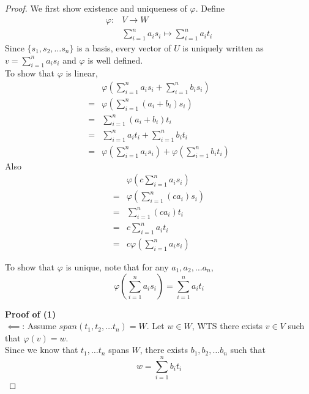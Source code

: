 \begin{proof}


We first show existence and uniqueness of $\varphi$. Define 
\begin{align*}
    \varphi: &V \to W \\
    & \sum\limits_{i = 1}^{n} a_i s_i \mapsto \sum\limits_{i = 1}^{n} a_i t_i
\end{align*}
Since $\{ s_1, s_2, \hdots s_n \} $ is a basis, every vector of $U$ is uniquely written as $v = \sum\limits_{i = 1}^{n} a_i s_i$ and $\varphi$ is well defined. \\

To show that $\varphi$ is linear, 
\begin{align*}
    & \varphi \left( \sum\limits_{i = 1}^{n} a_i s_i + \sum\limits_{i = 1}^{n}  b_i s_i \right)  \\
    = & \varphi \left( \sum\limits_{i = 1}^{n} (a_i + b_i) s_i\right)  \\
    = & \sum\limits_{i = 1}^{n} (a_i + b_i) t_i \\
    = & \sum\limits_{i = 1}^{n} a_i t_i + \sum\limits_{i = 1}^{n} b_i t_i \\
    = & \varphi \left( \sum\limits_{i = 1}^{n} a_i s_i \right)  + \varphi \left( \sum\limits_{i = 1}^{n} b_i t_i \right)
\end{align*}
Also
\begin{align*}
    & \varphi \left( c \sum\limits_{i = 1}^{n} a_i s_i \right)  \\
    = & \varphi \left( \sum\limits_{ i = 1}^{n} (ca_i) s_i \right)  \\
    = & \sum\limits_{i = 1}^{n} (ca_i) t_i \\
    = & c \sum\limits_{i = 1}^{n} a_i t_i \\
    = & c \varphi \left( \sum\limits_{ i = 1}^{n} a_i s_i \right) 
\end{align*}

To show that $\varphi$ is unique, note that for any $a_1, a_2, \hdots a_n$, 
\[
    \varphi \left( \sum\limits_{i = 1}^{n} a_i s_i \right)  = \sum\limits_{i = 1}^{n} a_i t_i
\]

\textbf{Proof of (1)} \\
$\impliedby$: Assume $span \left( t_1, t_2, \hdots t_n \right) = W$. Let $w \in W$, WTS there exists $v \in V$ such that $\varphi(v) = w$. \\

Since we know that $t_1, \hdots t_n$ spans $W$, there exists $b_1, b_2, \hdots b_n$ such that 
\[
    w = \sum\limits_{i = 1}^{n} b_i t_i
\]


\end{proof}

